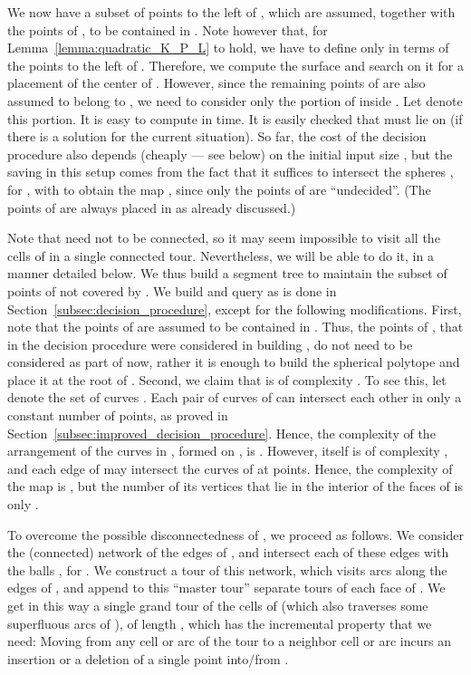 \documentclass[a4paper,12pt]{article}
\begin{document}
We now have a subset  of  points
to the left of , which are assumed, together with the
points of , to be contained in . Note however
that, for Lemma~\ref{lemma:quadratic_K_P_L} to hold, we have to
define  only in terms of the points to the left of
. Therefore, we compute the surface  and search on
it for a placement of the center  of . However, since the
remaining points of  are also assumed to belong to
, we need to consider only the portion of  inside
.
Let  denote this portion. It is easy to compute
 in  time. It is easily checked that 
must lie on  (if there is a solution for the current
situation). So far, the cost of the decision procedure also depends
(cheaply --- see below) on the initial input size , but the
saving in this setup comes from the fact that it suffices to
intersect the  spheres , for , with  to obtain the
map , since only the points of  are
``undecided''. (The points of  are always placed in
 as already discussed.)

Note that  need not to be connected, so it may seem
impossible to visit all the cells of  in a single connected tour.
Nevertheless, we will be able to do it, in a manner detailed below.
We thus build a segment tree  to maintain the subset 
of points of  not covered by . We build and query  as
is done in Section~\ref{subsec:decision_procedure}, except for the
following modifications. First, note that the points of
 are assumed to be contained in . Thus, the
points of , that in the decision procedure were
considered in building , do not need to be considered as part of
 now, rather it is enough to build the spherical polytope
 and place it at the
root of . Second, we claim that  is of complexity .
To see this, let  denote the set of curves . Each pair of curves of
 can intersect each other in only a constant number of points,
as proved in Section~\ref{subsec:improved_decision_procedure}.
Hence, the complexity of the arrangement of the  curves in
, formed on , is . However, 
itself is of complexity , and each edge of  may
intersect the curves of  at  points. Hence, the
complexity of the map  is , but the number of its
vertices that lie in the interior of the faces of  is only
.

To overcome the possible disconnectedness of , we
proceed as follows. We consider the (connected) network of the
 edges of , and intersect each of these edges with
the  balls , for . We construct a
tour of this network, which visits  arcs along the edges of
, and append to this ``master tour'' separate tours of
each face of . We get in this way a single grand tour of
the cells of  (which also traverses some superfluous arcs of
), of length , which has the
incremental property that we need: Moving from any cell or arc of
the tour to a neighbor cell or arc incurs an insertion or a deletion
of a single point into/from .
\end{document}
